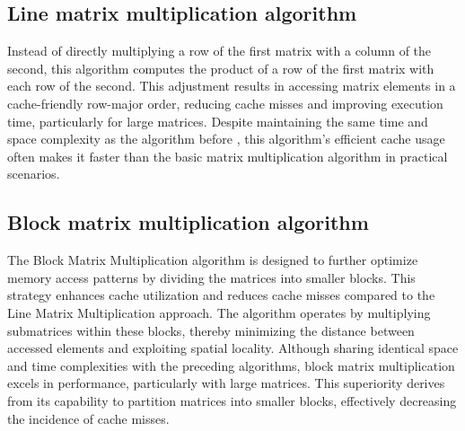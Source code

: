 \subsection{Line matrix multiplication algorithm}
\label{subsec:lineMatrixMultiplication}

Instead of directly multiplying a row of the 
first matrix with a column of the second, this algorithm
computes the product of a row of the first 
matrix with each row of the second. This 
adjustment results in accessing matrix 
elements in a cache-friendly row-major 
order, reducing cache misses and improving 
execution time, particularly for large matrices. 
Despite maintaining the same time and space complexity as the algorithm before
, this algorithm's 
efficient cache usage often makes it 
faster than the basic matrix multiplication 
algorithm in practical scenarios.


\subsection{Block matrix multiplication algorithm}
\label{subsec:blockMatrixMultiplication}

The Block Matrix Multiplication algorithm is designed 
to further optimize memory access patterns by dividing 
the matrices into smaller blocks. This strategy enhances 
cache utilization and reduces cache misses compared to the 
Line Matrix Multiplication approach. The algorithm operates by 
multiplying submatrices 
within these blocks, thereby minimizing the distance between 
accessed elements and exploiting spatial locality. Although 
sharing identical space and time complexities with the preceding 
algorithms, block matrix multiplication excels in performance, 
particularly with large matrices. This superiority derives from its 
capability to partition matrices into smaller blocks, effectively 
decreasing the incidence of cache misses.